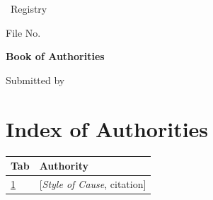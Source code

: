 \documentclass[12pt,letterpaper]{article}
\newcommand{\authority}[3]{%
    \newpage
    \phantomsection
    \label{auth:#1}
    \addcontentsline{toc}{section}{Tab #1: #2}
    \begin{center}
        \vspace*{3cm}
        {\Huge\bfseries Tab #1}

        \vspace{2em}
        {\Large\itshape #2}
    \end{center}
    
}
\begin{document}
\begin{titlepage}
    \centering
    \vspace*{2cm}
    {\large \CaseCourt\par}
    {\large \CaseRegistry\ Registry\par}
    \vspace{0.5cm}
    {\large File No. \CaseFileNo\par}
    \vspace{2cm}
    {\Huge\bfseries Book of Authorities\par}
    \vspace{1cm}
    {\LARGE \CaseStyle\par}
    \vspace{2cm}
    {\large Submitted by \PartyName\par}
    \vfill
\end{titlepage}

\section*{Index of Authorities}

\begin{longtable}{p{1.2cm}p{11cm}}
\toprule
\textbf{Tab} & \textbf{Authority} \\
\midrule
\endhead
\bottomrule
\endfoot
\hyperref[auth:1]{1} & [\textit{Style of Cause}, citation] \\
\end{longtable}

\end{document}
